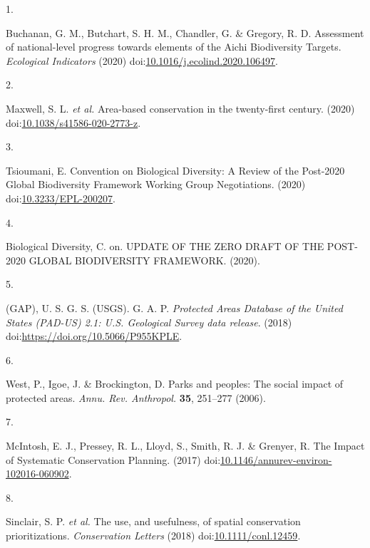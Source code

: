 \documentclass[3p]{elsarticle} %
\newlength{\cslhangindent}
\newlength{\csllabelwidth}
\newlength{\cslentryspacingunit} %
\newenvironment{CSLReferences}[2] %
 {%
  \setlength{\parindent}{0pt}
  \ifodd #1
  \let\oldpar\par
  \def\par{\hangindent=\cslhangindent\oldpar}
  \fi
  \setlength{\parskip}{#2\cslentryspacingunit}
 }%
 {}
\newcommand{\CSLLeftMargin}[1]{\parbox[t]{\csllabelwidth}{#1}}
\newcommand{\CSLRightInline}[1]{\parbox[t]{\linewidth - \csllabelwidth}{#1}\break}
\begin{document}
\hypertarget{refs}{}
\begin{CSLReferences}{0}{0}
\leavevmode{}%
\CSLLeftMargin{1. }
\CSLRightInline{Buchanan, G. M., Butchart, S. H. M., Chandler, G. \&
Gregory, R. D. {Assessment of national-level progress towards elements
of the Aichi Biodiversity Targets}. \emph{Ecological Indicators} (2020)
doi:\href{https://doi.org/10.1016/j.ecolind.2020.106497}{10.1016/j.ecolind.2020.106497}.}

\leavevmode{}%
\CSLLeftMargin{2. }
\CSLRightInline{Maxwell, S. L. \emph{et al.} {Area-based conservation in
the twenty-first century}. (2020)
doi:\href{https://doi.org/10.1038/s41586-020-2773-z}{10.1038/s41586-020-2773-z}.}

\leavevmode{}%
\CSLLeftMargin{3. }
\CSLRightInline{Tsioumani, E. {Convention on Biological Diversity: A
Review of the Post-2020 Global Biodiversity Framework Working Group
Negotiations}. (2020)
doi:\href{https://doi.org/10.3233/EPL-200207}{10.3233/EPL-200207}.}

\leavevmode{}%
\CSLLeftMargin{4. }
\CSLRightInline{Biological Diversity, C. on. {UPDATE OF THE ZERO DRAFT
OF THE POST-2020 GLOBAL BIODIVERSITY FRAMEWORK}. (2020).}

\leavevmode{}%
\CSLLeftMargin{5. }
\CSLRightInline{(GAP), U. S. G. S. (USGS). G. A. P. \emph{{Protected
Areas Database of the United States (PAD-US) 2.1: U.S. Geological Survey
data release}}. (2018) doi:\url{https://doi.org/10.5066/P955KPLE}.}

\leavevmode{}%
\CSLLeftMargin{6. }
\CSLRightInline{West, P., Igoe, J. \& Brockington, D. Parks and peoples:
The social impact of protected areas. \emph{Annu. Rev. Anthropol.}
\textbf{35}, 251--277 (2006).}

\leavevmode{}%
\CSLLeftMargin{7. }
\CSLRightInline{McIntosh, E. J., Pressey, R. L., Lloyd, S., Smith, R. J.
\& Grenyer, R. {The Impact of Systematic Conservation Planning}. (2017)
doi:\href{https://doi.org/10.1146/annurev-environ-102016-060902}{10.1146/annurev-environ-102016-060902}.}

\leavevmode{}%
\CSLLeftMargin{8. }
\CSLRightInline{Sinclair, S. P. \emph{et al.} {The use, and usefulness,
of spatial conservation prioritizations}. \emph{Conservation Letters}
(2018)
doi:\href{https://doi.org/10.1111/conl.12459}{10.1111/conl.12459}.}


\end{CSLReferences}
\end{document}
